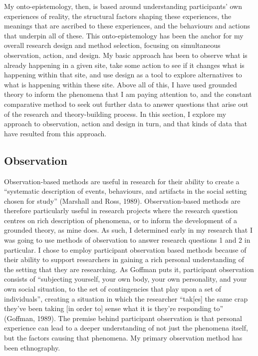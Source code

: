 My onto-epistemology, then, is based around understanding participants' own experiences of reality, the structural factors shaping these experiences, the meanings that are ascribed to these experiences, and the behaviours and actions that underpin all of these. This onto-epistemology has been the anchor for my overall research design and method selection, focusing on simultaneous observation, action, and design. My basic approach has been to observe what is already happening in a given site, take some action to see if it changes what is happening within that site, and use design as a tool to explore alternatives to what is happening within these site. Above all of this, I have used grounded theory to inform the phenomena that I am paying attention to, and the constant comparative method to seek out further data to answer questions that arise out of the research and theory-building process. In this section, I explore my approach to observation, action and design in turn, and that kinds of data that have resulted from this approach. 

\subsection{Observation}
\label{3-observation}

Observation-based methods are useful in research for their ability to create a “systematic description of events, behaviours, and artifacts in the social setting chosen for study” (Marshall and Ross, 1989). Observation-based methods are therefore particularly useful in research projects where the research question centres on rich description of phenomena, or to inform the development of a grounded theory, as mine does. As such, I determined early in my research that I was going to use methods of observation to answer research questions 1 and 2 in particular. I chose to employ participant observation based methods because of their ability to support researchers in gaining a rich personal understanding of the setting that they are researching. As Goffman puts it, participant observation consists of “subjecting yourself, your own body, your own personality, and your own social situation, to the set of contingencies that play upon a set of individuals”, creating a situation in which the researcher “tak[es] the same crap they’ve been taking [in order to] sense what it is they’re responding to” (Goffman, 1989). The premise behind participant observation is that personal experience can lead to a deeper understanding of not just the phenomena itself, but the factors causing that phenomena. My primary observation method has been ethnography. 

